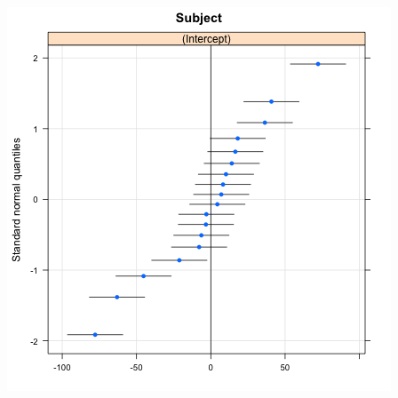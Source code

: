 \documentclass{beamer}
\begin{document}
\begin{frame}[fragile]
\begin{columns}
\begin{column}{0.5\textwidth}
\begin{center}
            \includegraphics[width=\textwidth]{lectures/day_12_bayesian_lm_II/figures/unnamed-chunk-22-1.png}
            \end{center}
        \end{column}
    \end{columns}
\end{frame}
\end{document}
